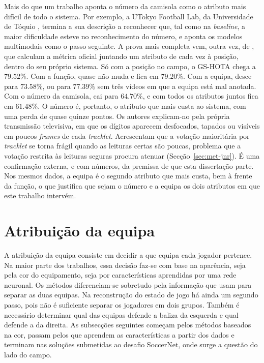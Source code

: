 Mais do que um trabalho aponta o número da camisola como o atributo mais difícil de todo o sistema. Por exemplo, a UTokyo Football Lab, da Universidade de Tóquio \citep[equipa GSR-8]{giancola2025soccernet}, termina a sua descrição a reconhecer que, tal como na \emph{baseline}, a maior dificuldade esteve no reconhecimento do número, e aponta os modelos multimodais como o passo seguinte. A prova mais completa vem, outra vez, de \citet{oo2026broadcast2pitch}, que calculam a métrica oficial juntando um atributo de cada vez à posição, dentro do seu próprio sistema. Só com a posição no campo, o GS-HOTA chega a $79{.}52\%$. Com a função, quase não muda e fica em $79{.}20\%$. Com a equipa, desce para $73{.}58\%$, ou para $77{.}39\%$ sem três vídeos em que a equipa está mal anotada. Com o número da camisola, cai para $64{.}70\%$, e com todos os atributos juntos fica em $61{.}48\%$. O número é, portanto, o atributo que mais custa ao sistema, com uma perda de quase quinze pontos. Os autores explicam-no pela própria transmissão televisiva, em que os dígitos aparecem desfocados, tapados ou visíveis em poucos \emph{frames} de cada \emph{tracklet}. Acrescentam que a votação maioritária por \emph{tracklet} se torna frágil quando as leituras certas são poucas, problema que a votação restrita às leituras seguras procura atenuar (Secção~\ref{sec:met-jnr}). É uma confirmação externa, e com números, da premissa de que esta dissertação parte. Nos mesmos dados, a equipa é o segundo atributo que mais custa, bem à frente da função, o que justifica que sejam o número e a equipa os dois atributos em que este trabalho intervém.


\section{Atribuição da equipa}

A atribuição da equipa consiste em decidir a que equipa cada jogador pertence. Na maior parte dos trabalhos, essa decisão faz-se com base na aparência, seja pela cor do equipamento, seja por características aprendidas por uma rede neuronal. Os métodos diferenciam-se sobretudo pela informação que usam para separar as duas equipas. 
Na reconstrução do estado de jogo há ainda um segundo passo, pois não é suficiente separar os jogadores em dois grupos. Também é necessário determinar qual das equipas defende a baliza da esquerda e qual defende a da direita. As subsecções seguintes começam pelos métodos baseados na cor, passam pelos que aprendem as características a partir dos dados e terminam nas soluções submetidas ao desafio SoccerNet, onde surge a questão do lado do campo.
